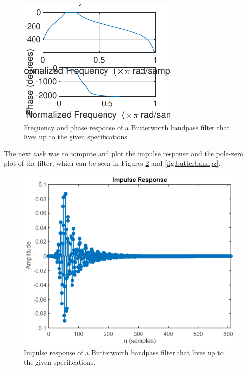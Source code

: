 \documentclass[journal]{IEEEtran}
\begin{document}
\begin{figure} [H]
    \centering
    \includegraphics[width=\columnwidth]{assignment_02/plots/butterbandfreq.pdf}
    \caption{Frequency and phase response of a Butterworth bandpass filter that lives up to the given specifications.}
    \label{fig:butterband}
\end{figure}

The next task was to compute and plot the impulse response and the pole-zero plot of the filter, which can be seen in Figures \ref{fig:butterbandimp} and \ref{fig:butterbandpz}.

\begin{figure} [H]
    \centering
    \includegraphics[width=\linewidth]{assignment_02/plots/1.1_BW_ImpRes.png}
    \caption{Impulse response of a Butterworth bandpass filter that lives up to the given specifications.}
    \label{fig:butterbandimp}
\end{figure}
\end{document}
